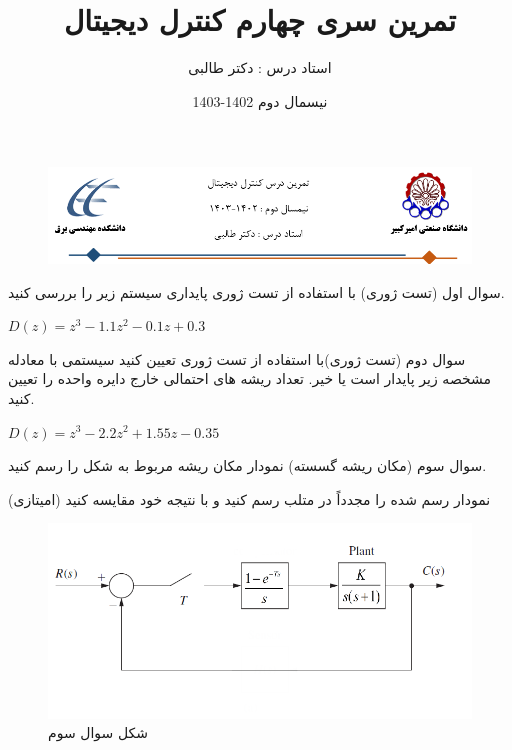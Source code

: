 \documentclass[12pt]{article}
\title{تمرین سری چهارم کنترل دیجیتال}
\date{نیسمال دوم 1402-1403}
\author{استاد درس : دکتر طالبی}
\begin{document}
\markboth{\theauthor}{\thetitle}



\begin{figure}[htbp]
    \centering
    \includegraphics[width=\linewidth]{Header.png}
\end{figure}



    \begin{problem}{سوال اول}
    	(تست ژوری) با استفاده از تست ژوری پایداری سیستم زیر را بررسی کنید.
    	
    	\centering
    	$D(z) = z^3 -1.1z^2 - 0.1z + 0.3$
    	

    \end{problem}
    
    \begin{problem}{سوال دوم}
    	(تست ژوری)با استفاده از تست ژوری تعیین کنید سیستمی با معادله مشخصه زیر پایدار است یا خیر. تعداد ریشه های احتمالی خارج دایره واحده را تعیین کنید.
    	
    	\centering
    	$D(z) = z^3 - 2.2z^2 + 1.55z - 0.35$
 
    \end{problem}
    
    \begin{problem}{سوال سوم}
    	(مکان ریشه گسسته) نمودار مکان ریشه مربوط به شکل را رسم کنید.
    	
    	
    	(امیتازی) نمودار رسم شده را مجدداً در متلب رسم کنید و با نتیجه خود مقایسه کنید
   
    \end{problem}
    \begin{figure}
    	\includegraphics[width=\linewidth]{Resources/1.png}
    	\caption{شکل سوال سوم}
    \end{figure}
    
\end{document}
